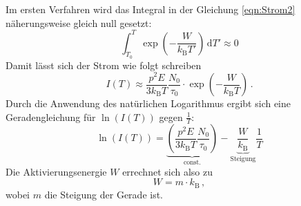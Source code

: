         \noindent Im ersten Verfahren wird das Integral in der Gleichung \eqref{eqn:Strom2} näherungsweise gleich null gesetzt:
        \begin{equation*}
            \int_{T_0}^{T} \exp\left(- \frac{W}{k_\text{B} T'}\right)\,\text{d}T' \approx 0
        \end{equation*}
        Damit lässt sich der Strom wie folgt schreiben
        \begin{equation*}
            I(T) \approx \frac{p^2E}{3 k_\text{B} T} \frac{N_0}{ \tau_0} \cdot  \exp\left(- \frac{W}{k_\text{B} T}\right) \,.
        \end{equation*}
        Durch die Anwendung des natürlichen Logarithmus ergibt sich eine Geradengleichung für $\ln\left(I(T)\right)$ gegen $\frac{1}{T}$:
        \begin{equation}
            \ln\left(I(T)\right) = \underbrace{\left(\frac{p^2E}{3 k_\text{B} T} \frac{N_0}{\tau_0}\right)}_{\text{const.}} - \underbrace{\frac{W}{k_\text{B}}}_{\text{Steigung}} \frac{1}{T}
            \label{eqn:geradengleichung}
        \end{equation}
        Die Aktivierungsenergie $W$ errechnet sich also zu 
        \begin{equation}
            W = m \cdot k_\text{B} \, ,
            \label{eqn:Aktivierungsenergie}
        \end{equation}
        wobei $m$ die Steigung der Gerade ist. \\

